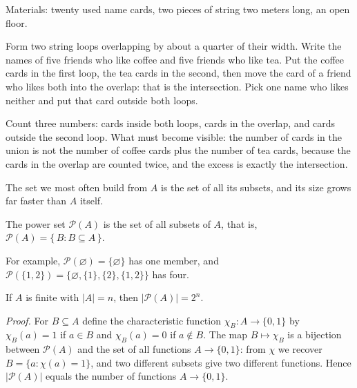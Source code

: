 \begin{tangan}
Materials: twenty used name cards, two pieces of string two meters long, an open floor.

Form two string loops overlapping by about a quarter of their width. Write the names
of five friends who like coffee and five friends who like tea. Put the coffee cards
in the first loop, the tea cards in the second, then move the card of a friend who
likes both into the overlap: that is the intersection. Pick one name who likes
neither and put that card outside both loops.

Count three numbers: cards inside both loops, cards in the overlap, and cards outside
the second loop. What must become visible: the number of cards in the union is not the
number of coffee cards plus the number of tea cards, because the cards in the overlap
are counted twice, and the excess is exactly the intersection.
\end{tangan}

The set we most often build from $A$ is the set of all its subsets, and its size grows
far faster than $A$ itself.

\begin{definisi}
The power set $\mathcal{P}(A)$ is the set of all subsets of $A$, that is,
$\mathcal{P}(A) = \{\, B : B \subseteq A \,\}$.
\end{definisi}


For example, $\mathcal{P}(\varnothing) = \{\varnothing\}$ has one member, and
$\mathcal{P}(\{1,2\}) = \{\varnothing, \{1\}, \{2\}, \{1,2\}\}$ has four.

\begin{proposisi}
If $A$ is finite with $|A| = n$, then $|\mathcal{P}(A)| = 2^{n}$.
\end{proposisi}
\par\smallskip\noindent\textit{Proof.} For $B \subseteq A$ define the characteristic
function $\chi_B : A \to \{0,1\}$ by $\chi_B(a) = 1$ if $a \in B$ and
$\chi_B(a) = 0$ if $a \notin B$. The map $B \mapsto \chi_B$ is a bijection between
$\mathcal{P}(A)$ and the set of all functions $A \to \{0,1\}$: from $\chi$ we recover
$B = \{a : \chi(a) = 1\}$, and two different subsets give two different functions.
Hence $|\mathcal{P}(A)|$ equals the number of functions $A \to \{0,1\}$.

